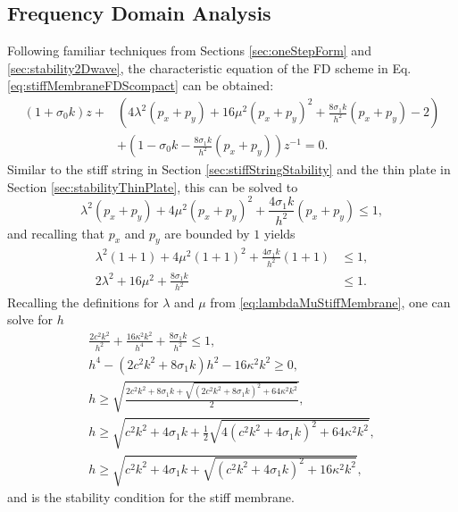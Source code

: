 {\subsection{Frequency Domain Analysis}\label{sec:stabilityStiffMembrane}
Following familiar techniques from Sections \ref{sec:oneStepForm} and \ref{sec:stability2Dwave}, the characteristic equation of the FD scheme in Eq. \eqref{eq:stiffMembraneFDScompact} can be obtained:
\begin{equation}
    \begin{aligned}
        (1+\sigma_0k)z + &\left(4\lambda^2 (p_x+p_y) + 16\mu^2(p_x+p_y)^2 + \frac{8\sigma_1k}{h^2}(p_x+p_y) - 2\right) \\
        &+ \left(1 - \sigma_0k - \frac{8\sigma_1k}{h^2}(p_x+p_y)\right)z^{-1} = 0.
    \end{aligned}
\end{equation}
Similar to the stiff string in Section \ref{sec:stiffStringStability} and the thin plate in Section \ref{sec:stabilityThinPlate}, this can be solved to 
\begin{equation*}
    \lambda^2(p_x+p_y) + 4\mu^2(p_x+p_y)^2 + \frac{4\sigma_1k}{h^2}(p_x+p_y) \leq 1,
\end{equation*}
and recalling that $p_x$ and $p_y$ are bounded by $1$ yields
\begin{align*}
    \lambda^2(1 + 1) + 4\mu^2(1+1)^2 + \frac{4\sigma_1k}{h^2}(1+1) &\leq 1,\\
    2\lambda^2 + 16\mu^2 + \frac{8\sigma_1k}{h^2} &\leq 1 .
\end{align*}
Recalling the definitions for $\lambda$ and $\mu$ from \ref{eq:lambdaMuStiffMembrane}, one can solve for $h$ 
\begin{gather}
    \frac{2c^2k^2}{h^2}+ \frac{16\kappa^2k^2}{h^4} + \frac{8\sigma_1k}{h^2} \leq 1,\nonumber\\
    h^4 - (2c^2k^2 + 8\sigma_1k)h^2 - 16\kappa^2k^2 \geq 0,\nonumber\\
    h\geq \sqrt{\frac{2c^2k^2 + 8\sigma_1k+\sqrt{(2c^2k^2 + 8\sigma_1k)^2 + 64\kappa^2k^2}}{2}},\nonumber \\
    h\geq \sqrt{c^2k^2 + 4\sigma_1k+\frac{1}{2}\sqrt{4(c^2k^2 + 4\sigma_1k)^2 + 64\kappa^2k^2}},\nonumber\\
    h\geq \sqrt{c^2k^2 + 4\sigma_1k+\sqrt{(c^2k^2 + 4\sigma_1k)^2 + 16\kappa^2k^2}},
\end{gather}
and is the stability condition for the stiff membrane. 
}
